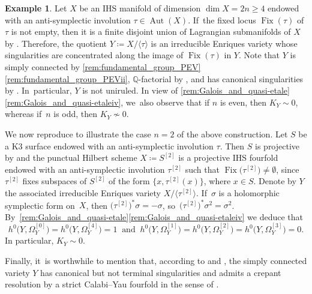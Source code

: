 \documentclass[10pt]{amsart}
\theoremstyle{plain}
\theoremstyle{definition}
\newtheorem{exa}[thm]{Example}
\newcommand{\Q}{\mathbb{Q}}
\DeclareMathOperator{\Aut}{Aut}
\DeclareMathOperator{\Fix}{Fix}
\begin{document}
\begin{exa}
\label{example:IEV_via_anti-symplectic_involution}
Let $X$ be an IHS manifold of dimension $\dim X = 2n \geq 4$ endowed with an anti-symplectic involution $\tau \in \Aut(X)$. If~the fixed locus $\Fix(\tau)$ of $\tau$ is not empty, then it is a finite disjoint union of Lagrangian submanifolds of $X$ by \cite[Lem.\,1]{Beauville11}.
Therefore, the quotient $Y \coloneqq X/ \langle \tau \rangle$ is an irreducible Enriques variety whose singularities are concentrated along the image of $\Fix(\tau)$ in $Y$. Note that $Y$ is simply connected by \autoref{rem:fundamental_group_PEV}\eqref{rem:fundamental_group_PEVii}, $\Q$\nobreakdash-factorial by \cite[Prop.\,5.15]{KM98}, and has canonical singularities by \cite[Cor.\,2.31(2) \& Prop.\,5.20(2)]{KM98}. In~particular, $Y$ is not uniruled.
In view of \autoref{rem:Galois_and_quasi-etale}\eqref{rem:Galois_and_quasi-etaleiv}, we~also observe that if $n$ is even, then $K_Y \sim 0$, whereas if~$n$ is odd, then $K_Y \not \sim 0$.

We now reproduce \cite[Ex.\,14.9]{GGK19} to illustrate the case $n=2$ of the above construction. Let $S$ be a K3 surface endowed with an anti-symplectic involution $\tau$. Then $S$ is projective by \cite[Prop.\,6(i)]{Beauville83b} and the punctual Hilbert scheme $X \coloneqq S^{[2]}$ is a projective IHS fourfold endowed with an anti-symplectic involution $\tau^{[2]}$ such that $\Fix\bigl(\tau^{[2]} \bigr) \neq \emptyset$, since $\tau^{[2]}$ fixes subspaces of $S^{[2]}$ of the form $ \big \{ x, \tau^{[2]}(x) \big \}$, where $x \in S$. Denote by $Y$ the associated irreducible Enriques variety $X / \langle \tau^{[2]} \rangle$. If~$\sigma$ is a holomorphic symplectic form on~$X$, then $\bigl(\tau^{[2]} \bigr)^* \sigma = -\sigma$, so~$\bigl(\tau^{[2]} \bigr)^* \sigma^2 = \sigma^2$. By~\autoref{rem:Galois_and_quasi-etale}\eqref{rem:Galois_and_quasi-etaleiv} we deduce that
\[
h^0 \bigl(Y,\Omega_Y^{[0]} \bigr) = h^0 \bigl(Y,\Omega_Y^{[4]} \bigr) = 1 \ \text{ and } \ h^0 \bigl(Y,\Omega_Y^{[1]} \bigr) = h^0 \bigl(Y,\Omega_Y^{[2]} \bigr) = h^0 \bigl(Y,\Omega_Y^{[3]} \bigr) = 0.
\]
In particular, $K_Y \sim 0$.

Finally, it~is worthwhile to mention that, according to \cite[Th.\,3.6]{CGM19} and \cite[Th.\,1.1]{Tak03}, the simply connected variety $Y$ has canonical but not terminal singularities and admits a crepant resolution by a strict Calabi--Yau fourfold in the sense of \cite[Prop.\,2]{Beauville83a}.
\end{exa}
\end{document}
